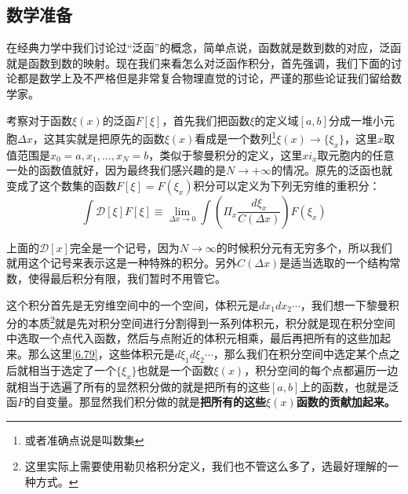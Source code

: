 \documentclass[a4paper,zihao=-4,linespread=1]{ctexrep}
\begin{document}
	\subsection*{数学准备}
	在经典力学中我们讨论过“泛函”的概念，简单点说，函数就是数到数的对应，泛函就是函数到数的映射。现在我们来看怎么对泛函作积分，首先强调，我们下面的讨论都是数学上及不严格但是非常复合物理直觉的讨论，严谨的那些论证我们留给数学家。
	
	考察对于函数$\xi(x)$的泛函$F[\xi]$，首先我们把函数$\xi$的定义域$[a,b]$分成一堆小元胞$\Delta x$，这其实就是把原先的函数$\xi(x)$看成是一个数列\footnote{或者准确点说是叫数集}$\xi(x)\to\{\xi_x\}$，这里$x$取值范围是$x_0=a,x_1,\ldots,x_N=b$，类似于黎曼积分的定义，这里$xi_x$取元胞内的任意一处的函数值就好，因为最终我们感兴趣的是$N\to+\infty$的情况。原先的泛函也就变成了这个数集的函数$F[\xi]=F(\xi_x)$积分可以定义为下列无穷维的重积分：
	\begin{equation}
		\label{6.79}
		\int \mathcal{D}[\xi]F[\xi]\equiv\lim_{\Delta x\to 0}\int\left(\Pi_x\frac{d\xi_x}{C(\Delta x)}\right)F(\xi_x)
	\end{equation}
	
	上面的$\mathcal{D}[x]$完全是一个记号，因为$N\to\infty$的时候积分元有无穷多个，所以我们就用这个记号来表示这是一种特殊的积分。另外$C(\Delta x)$是适当选取的一个结构常数，使得最后积分有限，我们暂时不用管它。
	
	这个积分首先是无穷维空间中的一个空间，体积元是$dx_1dx_2\cdots$，我们想一下黎曼积分的本质\footnote{这里实际上需要使用勒贝格积分定义，我们也不管这么多了，选最好理解的一种方式。}就是先对积分空间进行分割得到一系列体积元，积分就是现在积分空间中选取一个点代入函数，然后与点附近的体积元相乘，最后再把所有的这些加起来。那么这里\ref{6.79}，这些体积元是$d\xi_1d\xi_2\cdots$，那么我们在积分空间中选定某个点之后就相当于选定了一个$\{\xi_x\}$也就是一个函数$\xi(x)$，积分空间的每个点都遍历一边就相当于选遍了所有的显然积分做的就是把所有的这些$[a,b]$上的函数，也就是泛函$F$的自变量。那显然我们积分做的就是\textbf{把所有的这些$\xi(x)$函数的贡献加起来。}
	
\end{document}
